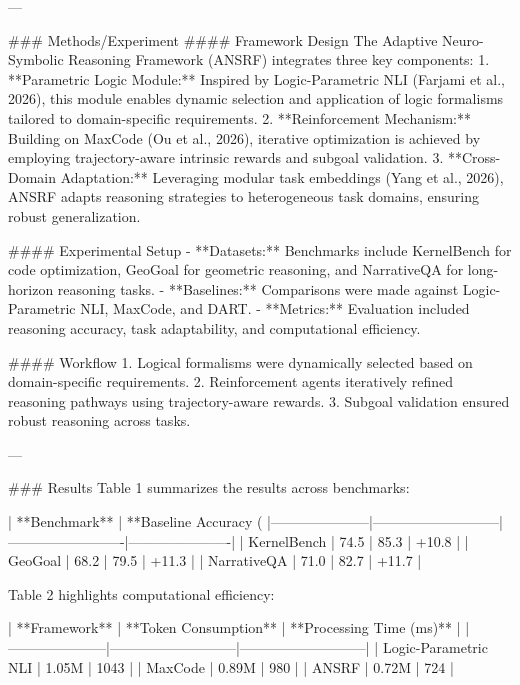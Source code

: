 ---

### Methods/Experiment  
#### Framework Design  
The Adaptive Neuro-Symbolic Reasoning Framework (ANSRF) integrates three key components:  
1. **Parametric Logic Module:** Inspired by Logic-Parametric NLI (Farjami et al., 2026), this module enables dynamic selection and application of logic formalisms tailored to domain-specific requirements.  
2. **Reinforcement Mechanism:** Building on MaxCode (Ou et al., 2026), iterative optimization is achieved by employing trajectory-aware intrinsic rewards and subgoal validation.  
3. **Cross-Domain Adaptation:** Leveraging modular task embeddings (Yang et al., 2026), ANSRF adapts reasoning strategies to heterogeneous task domains, ensuring robust generalization.

#### Experimental Setup  
- **Datasets:** Benchmarks include KernelBench for code optimization, GeoGoal for geometric reasoning, and NarrativeQA for long-horizon reasoning tasks.  
- **Baselines:** Comparisons were made against Logic-Parametric NLI, MaxCode, and DART.  
- **Metrics:** Evaluation included reasoning accuracy, task adaptability, and computational efficiency.

#### Workflow  
1. Logical formalisms were dynamically selected based on domain-specific requirements.  
2. Reinforcement agents iteratively refined reasoning pathways using trajectory-aware rewards.  
3. Subgoal validation ensured robust reasoning across tasks.  

---

### Results  
Table 1 summarizes the results across benchmarks:  

| **Benchmark**      | **Baseline Accuracy (%
|---------------------|---------------------------|-------------------------|----------------------|  
| KernelBench         | 74.5                     | 85.3                   | +10.8               |  
| GeoGoal             | 68.2                     | 79.5                   | +11.3               |  
| NarrativeQA         | 71.0                     | 82.7                   | +11.7               |  

Table 2 highlights computational efficiency:  

| **Framework**       | **Token Consumption**      | **Processing Time (ms)** |  
|---------------------|---------------------------|---------------------------|  
| Logic-Parametric NLI | 1.05M                    | 1043                      |  
| MaxCode             | 0.89M                    | 980                       |  
| ANSRF               | 0.72M                    | 724                       |  

